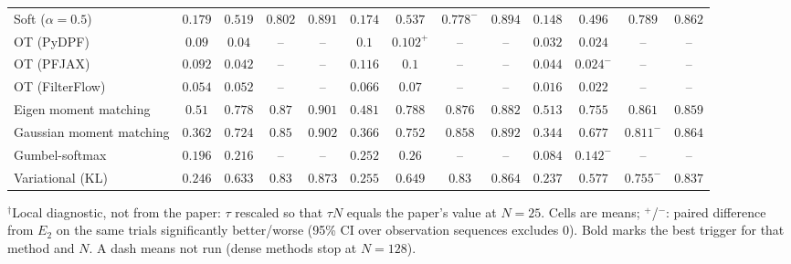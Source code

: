 \begin{table}[ht]
\begin{adjustbox}{max width=\linewidth}
\begin{tabular}{lcccc|cccc|cccc}
Soft ($\alpha{=}0.5$) & $\mathbf{0.179}$ & $0.519$ & $\mathbf{0.802}$ & $0.891$ & $0.174$ & $\mathbf{0.537}$ & $0.778^{-}$ & $\mathbf{0.894}$ & $0.148$ & $0.496$ & $0.789$ & $0.862$ \\
OT (PyDPF) & $0.09$ & $0.04$ & -- & -- & $\mathbf{0.1}$ & $\mathbf{0.102}^{+}$ & -- & -- & $0.032$ & $0.024$ & -- & -- \\
OT (PFJAX) & $0.092$ & $0.042$ & -- & -- & $\mathbf{0.116}$ & $\mathbf{0.1}$ & -- & -- & $0.044$ & $0.024^{-}$ & -- & -- \\
OT (FilterFlow) & $0.054$ & $0.052$ & -- & -- & $\mathbf{0.066}$ & $\mathbf{0.07}$ & -- & -- & $0.016$ & $0.022$ & -- & -- \\
Eigen moment matching & $0.51$ & $0.778$ & $0.87$ & $\mathbf{0.901}$ & $0.481$ & $\mathbf{0.788}$ & $\mathbf{0.876}$ & $0.882$ & $\mathbf{0.513}$ & $0.755$ & $0.861$ & $0.859$ \\
Gaussian moment matching & $0.362$ & $0.724$ & $0.85$ & $\mathbf{0.902}$ & $\mathbf{0.366}$ & $\mathbf{0.752}$ & $\mathbf{0.858}$ & $0.892$ & $0.344$ & $0.677$ & $0.811^{-}$ & $0.864$ \\
Gumbel-softmax & $0.196$ & $0.216$ & -- & -- & $\mathbf{0.252}$ & $\mathbf{0.26}$ & -- & -- & $0.084$ & $0.142^{-}$ & -- & -- \\
Variational (KL) & $0.246$ & $0.633$ & $\mathbf{0.83}$ & $\mathbf{0.873}$ & $\mathbf{0.255}$ & $\mathbf{0.649}$ & $\mathbf{0.83}$ & $0.864$ & $0.237$ & $0.577$ & $0.755^{-}$ & $0.837$ \\
\bottomrule
\end{tabular}
\end{adjustbox}
\par\smallskip\parbox{0.95\linewidth}{\footnotesize $^\dagger$Local diagnostic, not from the paper: $\tau$ rescaled so that $\tau N$ equals the paper's value at $N{=}25$. Cells are means; $^{+}$/$^{-}$: paired difference from $E_2$ on the same trials significantly better/worse (95\% CI over observation sequences excludes 0). Bold marks the best trigger for that method and $N$. A dash means not run (dense methods stop at $N{=}128$).}
\end{table}

